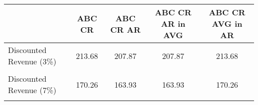 \begin{tabular}{l*{4}{c}}
\hline\hline
                &   ABC CR&ABC CR AR&ABC CR AR in AVG&ABC CR AVG in AR\\
\hline
Discounted Revenue (3\%)&   213.68&   207.87&   207.87&   213.68\\
                &         &         &         &         \\
Discounted Revenue (7\%)&   170.26&   163.93&   163.93&   170.26\\
                &         &         &         &         \\
\hline\hline
\end{tabular}
